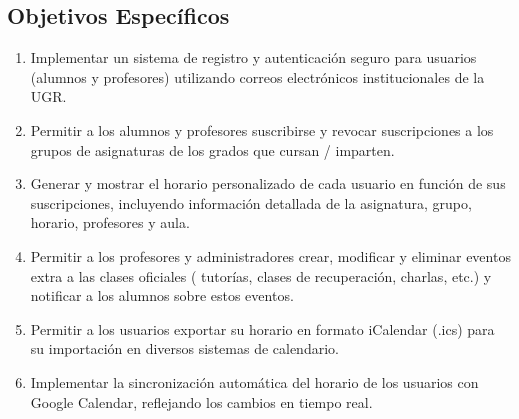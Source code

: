 \subsection{Objetivos Específicos}

\begin{enumerate}
    \item Implementar un sistema de registro y autenticación seguro para usuarios (alumnos y profesores) utilizando correos electrónicos institucionales de la UGR.
    \item Permitir a los alumnos y profesores suscribirse y revocar suscripciones a los grupos de asignaturas de los grados que cursan / imparten.
    \item Generar y mostrar el horario personalizado de cada usuario en función de sus suscripciones, incluyendo información detallada de la asignatura, grupo, horario, profesores y aula.
    \item Permitir a los profesores y administradores crear, modificar y eliminar eventos extra a las clases oficiales ( tutorías, clases de recuperación, charlas, etc.) y notificar a los alumnos sobre estos eventos.
    \item Permitir a los usuarios exportar su horario en formato iCalendar (.ics) para su importación en diversos sistemas de calendario.
    \item Implementar la sincronización automática del horario de los usuarios con Google Calendar, reflejando los cambios en tiempo real.
\end{enumerate}
